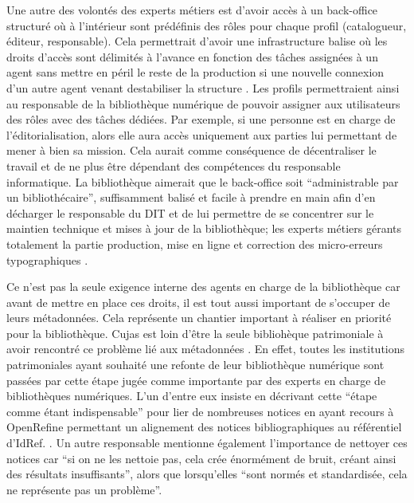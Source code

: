 Une autre des volontés des experts métiers est d'avoir accès à un back-office structuré où à l'intérieur sont prédéfinis des rôles pour chaque profil (catalogueur, éditeur, responsable). Cela permettrait d'avoir une infrastructure balise où les droits d'accès sont délimités à l'avance en fonction des tâches assignées à un agent sans mettre en péril le reste de la production si une nouvelle connexion d'un autre agent venant destabiliser la structure . Les profils permettraient ainsi au responsable de la bibliothèque numérique de pouvoir assigner aux utilisateurs des rôles avec des tâches dédiées. Par exemple, si une personne est en charge de l'éditorialisation, alors elle aura accès uniquement aux parties lui permettant de mener à bien sa mission. Cela aurait comme conséquence de décentraliser le travail et de ne plus être dépendant des compétences du responsable informatique. La bibliothèque aimerait que le back-office soit \enquote{administrable par un bibliothécaire}, suffisamment balisé et facile à prendre en main afin d'en décharger le responsable du \ac{DIT} et de lui permettre de se concentrer sur le maintien technique et mises à jour de la bibliothèque; les experts métiers gérants totalement la partie production, mise en ligne et correction des micro-erreurs typographiques . 

Ce n'est pas la seule exigence interne des agents en charge de la bibliothèque car avant de mettre en place ces droits, il est tout aussi important de s'occuper de leurs métadonnées. Cela représente un chantier important à réaliser en priorité pour la bibliothèque. Cujas est loin d'être la seule bibliohèque patrimoniale à avoir rencontré ce problème lié aux métadonnées . En effet, toutes les institutions patrimoniales ayant souhaité une refonte de leur bibliothèque numérique sont passées par cette étape jugée comme importante par des experts en charge de bibliothèques numériques. L'un d'entre eux insiste en décrivant cette \enquote{étape comme étant indispensable} pour lier de nombreuses notices en ayant recours à OpenRefine permettant un alignement des notices bibliographiques au référentiel d'IdRef. . Un autre responsable mentionne également l'importance de nettoyer ces notices car \enquote{si on ne les nettoie pas, cela crée énormément de bruit, créant ainsi des résultats insuffisants}, alors que lorsqu'elles \enquote{sont normés et standardisée, cela ne représente pas un problème}. 

